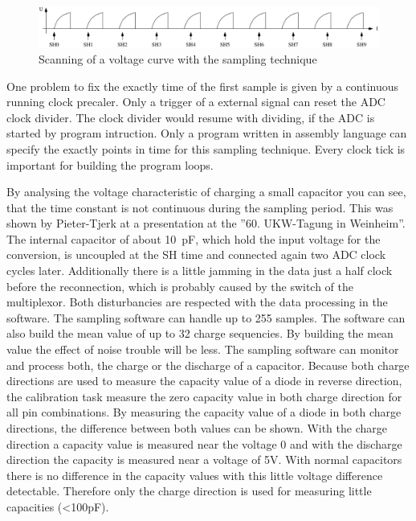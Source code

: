 \begin{figure}[H]
\centering
\includegraphics[width=18cm]{../FIG/sampling.pdf}
\caption{Scanning of a voltage curve with the sampling technique}
\label{fig:sampling}
\end{figure}

One problem to fix the exactly time of the first sample is given by a continuous running clock precaler.
Only a trigger of a external signal can reset the ADC clock divider.
The clock divider would resume with dividing, if the ADC is started by program intruction.
Only a program written in assembly language can specify the exactly points in time for
this sampling technique. Every clock tick is important for building the program loops.

By analysing the voltage characteristic of charging a small capacitor you can see, that the time constant
is not continuous during the sampling period. This was shown by Pieter-Tjerk at a presentation at
the ''60. UKW-Tagung in Weinheim''. The internal capacitor of about 10~pF, which hold the input voltage
for the conversion, is uncoupled at the SH time and connected again two ADC clock cycles later. 
Additionally there is a little jamming in the data just a half clock before the reconnection,
which is probably caused by the switch of the multiplexor.
Both disturbancies are respected with the data processing in the software.
The sampling software can handle up to 255 samples. The software can also build the mean value of
up to 32 charge sequencies. By building the mean value the effect of noise trouble will be less.
The sampling software can monitor and process both, the charge or the discharge of a capacitor.
Because both charge directions are used to measure the capacity value of a diode in reverse direction,
the calibration task measure the zero capacity value in both charge direction for all pin combinations.
By measuring the capacity value of a diode in both charge directions, the difference between both
values can be shown.
With the charge direction a capacity value is measured near the voltage 0 and with
the discharge direction the capacity is measured near a voltage of 5V.
With normal capacitors there is no difference in the capacity values with this little voltage difference detectable.
Therefore only the charge direction is used for measuring little capacities (\textless 100pF).


